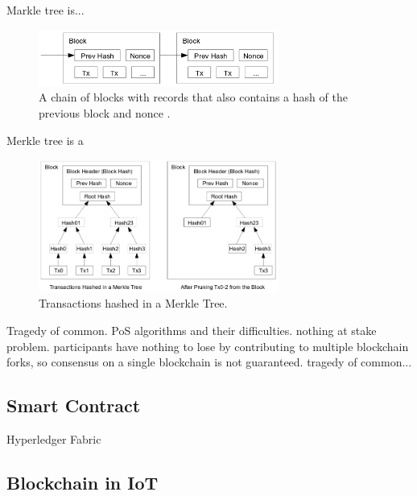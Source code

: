 Markle tree is...

\begin{figure}[ht]
	\centering
	\includegraphics[width=0.7\textwidth]{images/blockchain-pow-satoshi.png}
	\caption{\label{fig:satoshi-blockchain-pow}A chain of blocks with records that also contains a hash of the previous block and nonce \cite{nakamoto_bitcoin:_2008}.}
\end{figure}

Merkle tree is a 

\begin{figure}[ht]
	\centering
	\includegraphics[width=0.7\textwidth]{images/merkle-tree-satoshi.png}
	\caption{\label{fig:satoshi-merkle-tree}Transactions hashed in a Merkle Tree\cite{nakamoto_bitcoin:_2008}.}
\end{figure}

Tragedy of common. PoS algorithms and their difficulties. nothing at stake problem. participants have nothing to lose by contributing to multiple blockchain forks, so consensus on a single blockchain is not guaranteed. tragedy of common...

\subsection{Smart Contract}
Hyperledger Fabric \cite{vukolic_rethinking_2017}

\subsection{Blockchain in IoT}


